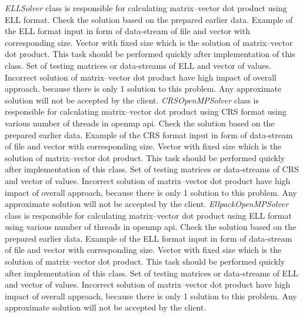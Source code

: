 	{
		{
			\emph{ELLSolver} class is responsible for calculating matrix--vector dot product using \gls{ELL} format.
		}
		{
			Check the solution based on the prepared earlier data.
		}
		{
			Example of the \gls{ELL} format input in form of data-stream of file and vector with corresponding size.
		}
		{
			Vector with fixed size which is the solution of matrix--vector dot product.
		}
		{
			This task should be performed quickly after implementation of this class.
		}
		{
			Set of testing matrices or data-streams of \gls{ELL} and vector of values.
		}
		{
			Incorrect solution of matrix--vector dot product have high impact of overall approach, because there is only 1 solution to this problem. Any approximate solution will not be accepted by the client.
		}
	}
	\clearpage
	{
		{
			\emph{CRSOpenMPSolver} class is responsible for calculating matrix--vector dot product using \gls{CRS} format using various number of threads in \gls{openmp} api.
		}
		{
			Check the solution based on the prepared earlier data.
		}
		{
			Example of the \gls{CRS} format input in form of data-stream of file and vector with corresponding size.
		}
		{
			Vector with fixed size which is the solution of matrix--vector dot product.
		}
		{
			This task should be performed quickly after implementation of this class.
		}
		{
			Set of testing matrices or data-streams of \gls{CRS} and vector of values.
		}
		{
			Incorrect solution of matrix--vector dot product have high impact of overall approach, because there is only 1 solution to this problem. Any approximate solution will not be accepted by the client.
		}
	}
	{
		{
			\emph{EllpackOpenMPSolver} class is responsible for calculating matrix--vector dot product using \gls{ELL} format using various number of threads in \gls{openmp} api.
		}
		{
			Check the solution based on the prepared earlier data.
		}
		{
			Example of the \gls{ELL} format input in form of data-stream of file and vector with corresponding size.
		}
		{
			Vector with fixed size which is the solution of matrix--vector dot product.
		}
		{
			This task should be performed quickly after implementation of this class.
		}
		{
			Set of testing matrices or data-streams of \gls{ELL} and vector of values.
		}
		{
			Incorrect solution of matrix--vector dot product have high impact of overall approach, because there is only 1 solution to this problem. Any approximate solution will not be accepted by the client.
		}
	}
